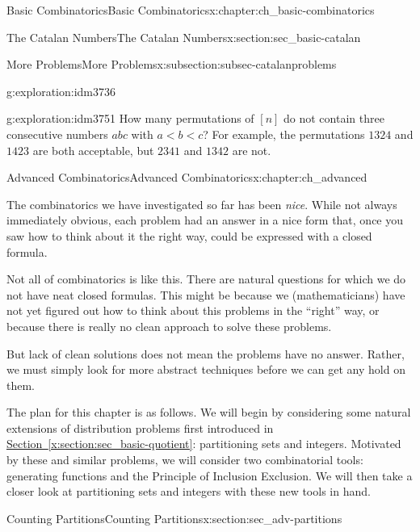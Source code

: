 \documentclass[oneside,10pt,]{book}
\numberwithin{equation}{chapter}
\newcommand{\lt}{<}
\begin{document}
\begin{chapterptx}{Basic Combinatorics}{}{Basic Combinatorics}{}{}{x:chapter:ch_basic-combinatorics}
\begin{sectionptx}{The Catalan Numbers}{}{The Catalan Numbers}{}{}{x:section:sec_basic-catalan}
\begin{subsectionptx}{More Problems}{}{More Problems}{}{}{x:subsection:subsec-catalanproblems}
\begin{exploration}{}{g:exploration:idm3736}
\end{exploration}
\begin{exploration}{}{g:exploration:idm3751}%
How many permutations of \([n]\) do not contain three consecutive numbers \(abc\) with \(a \lt b \lt c\)?  For example, the permutations \(1324\) and \(1423\) are both acceptable, but \(2341\) and \(1342\) are not.%
\end{exploration}
\end{subsectionptx}
\end{sectionptx}
\end{chapterptx}
%
%
\typeout{************************************************}
\typeout{************************************************}
%
\begin{chapterptx}{Advanced Combinatorics}{}{Advanced Combinatorics}{}{}{x:chapter:ch_advanced}
\begin{introduction}{}%
The combinatorics we have investigated so far has been \emph{nice}.  While not always immediately obvious, each problem had an answer in a nice form that, once you saw how to think about it the right way, could be expressed with a closed formula.%
\par
Not all of combinatorics is like this.  There are natural questions for which we do not have neat closed formulas.  This might be because we (mathematicians) have not yet figured out how to think about this problems in the ``right'' way, or because there is really no clean approach to solve these problems.%
\par
But lack of clean solutions does not mean the problems have no answer.  Rather, we must simply look for more abstract techniques before we can get any hold on them.%
\par
The plan for this chapter is as follows.  We will begin by considering some natural extensions of distribution problems first introduced in \hyperref[x:section:sec_basic-quotient]{Section~\ref{x:section:sec_basic-quotient}}: partitioning sets and integers.  Motivated by these and similar problems, we will consider two combinatorial tools: generating functions and the Principle of Inclusion Exclusion.  We will then take a closer look at partitioning sets and integers with these new tools in hand.%
\end{introduction}%
%
%
\typeout{************************************************}
\typeout{************************************************}
%
\begin{sectionptx}{Counting Partitions}{}{Counting Partitions}{}{}{x:section:sec_adv-partitions}

\end{sectionptx}
\end{chapterptx}
\end{document}
